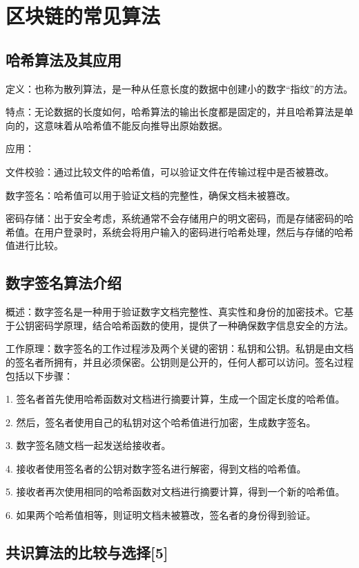 
\chapter{区块链的常见算法}


\section{哈希算法及其应用}

定义：也称为散列算法，是一种从任意长度的数据中创建小的数字“指纹”的方法。

特点：无论数据的长度如何，哈希算法的输出长度都是固定的，并且哈希算法是单向的，这意味着从哈希值不能反向推导出原始数据。

应用：

文件校验：通过比较文件的哈希值，可以验证文件在传输过程中是否被篡改。

数字签名：哈希值可以用于验证文档的完整性，确保文档未被篡改。

密码存储：出于安全考虑，系统通常不会存储用户的明文密码，而是存储密码的哈希值。在用户登录时，系统会将用户输入的密码进行哈希处理，然后与存储的哈希值进行比较。


\section{数字签名算法介绍}

概述：数字签名是一种用于验证数字文档完整性、真实性和身份的加密技术。它基于公钥密码学原理，结合哈希函数的使用，提供了一种确保数字信息安全的方法。

工作原理：数字签名的工作过程涉及两个关键的密钥：私钥和公钥。私钥是由文档的签名者所拥有，并且必须保密。公钥则是公开的，任何人都可以访问。签名过程包括以下步骤：

1.	签名者首先使用哈希函数对文档进行摘要计算，生成一个固定长度的哈希值。

2.	然后，签名者使用自己的私钥对这个哈希值进行加密，生成数字签名。

3.	数字签名随文档一起发送给接收者。

4.	接收者使用签名者的公钥对数字签名进行解密，得到文档的哈希值。

5.	接收者再次使用相同的哈希函数对文档进行摘要计算，得到一个新的哈希值。

6.	如果两个哈希值相等，则证明文档未被篡改，签名者的身份得到验证。


\section{共识算法的比较与选择[5]}

